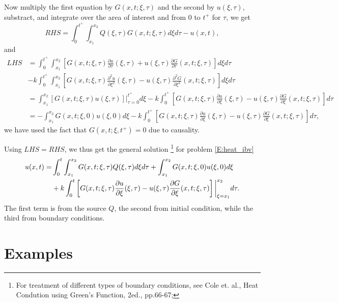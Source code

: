 Now multiply the first equation by $G(x,t;\xi,\tau)$ and the second by
$u(\xi,\tau)$, substract, and integrate over the area of interest and from $0$
to $t^+$ for $\tau$, we get
\[
  RHS = \int_0^{t^+} \int_{x_1}^{x_2} Q(\xi,\tau) G(x,t;\xi,\tau) d\xi d\tau
        - u(x,t),
\]
and
\begin{align*}
  LHS &= \int_0^{t^+} \int_{x_1}^{x_2} 
       \left[ G(x,t;\xi,\tau) \frac{\partial u}{\partial\tau}(\xi,\tau)
         + u(\xi,\tau) \frac{\partial G}{\partial\tau}(x,t;\xi,\tau)
       \right] d\xi d\tau  \\
     &-k \int_0^{t^+} \int_{x_1}^{x_2} 
       \left[ G(x,t;\xi,\tau) \frac{\partial^2 u}{\partial\xi^2}(\xi,\tau)
         - u(\xi,\tau) \frac{\partial^2 G}{\partial\xi^2}(x,t;\xi,\tau)
       \right] d\xi d\tau  \\
     &= \int_{x_1}^{x_2} \left[ G(x,t;\xi,\tau) u(\xi,\tau) \right]
        \bigg\rvert_{\tau=0}^{t^+} d\xi   
     -k \int_0^{t^+} 
       \left[ G(x,t;\xi,\tau) \frac{\partial u}{\partial\xi}(\xi,\tau)
         - u(\xi,\tau) \frac{\partial G}{\partial\xi}(x,t;\xi,\tau)
       \right] d\tau  \\
     &= - \int_{x_1}^{x_2} G(x,t;\xi,0) u(\xi,0) d\xi   
     -k \int_0^{t^+} 
       \left[ G(x,t;\xi,\tau) \frac{\partial u}{\partial\xi}(\xi,\tau)
         - u(\xi,\tau) \frac{\partial G}{\partial\xi}(x,t;\xi,\tau)
       \right] d\tau,
\end{align*}
we have used the fact that $G(x,t;\xi,t^+)=0$ due to causality.

Using $LHS=RHS$, we thus get the general solution 
\footnote{For treatment of different types of boundary conditions, see
  Cole et. al., Heat Condution using Green's Function, 2ed., pp.66-67;}
for problem \ref{E:heat_ibv}
\begin{align}
  u(x,t) 
    =& \int_0^t \int_{x_1}^{x_2} G(x,t;\xi,\tau) Q(\xi,\tau) d\xi d\tau
       + \int_{x_1}^{x_2} G(x,t;\xi,0) u(\xi,0) d\xi  \notag \\
    &+ k\int_0^t 
     \left[
   	 G(x,t;\xi,\tau) \frac{\partial u}{\partial\xi}(\xi,\tau)
  	 -u(\xi,\tau) \frac{\partial G}{\partial\xi}(x,t;\xi,\tau)
    \right] \bigg\rvert_{\xi=x_1}^{x_2} d\tau.
\end{align}
The first term is from the source $Q$, the second from initial condition, while
the third from boundary conditions.


\section{Examples}

